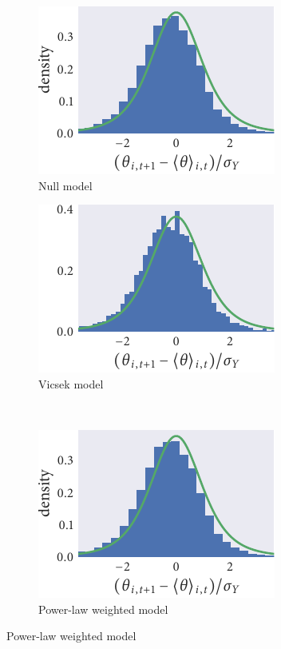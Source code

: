 \begin{figure}
  \begin{subfigure}[b]{0.33333\textwidth}
    \caption{Null model}
    \includegraphics{seq2/null_residuals.pdf}
  \end{subfigure}\hspace{2pt}
  \begin{subfigure}[b]{0.33333\textwidth}
    \caption{Vicsek model}
    \includegraphics{seq2/r_residuals.pdf}
  \end{subfigure}\vspace{1em}\\
  \begin{subfigure}[b]{0.33333\textwidth}
    \includegraphics{seq2/power_residuals.pdf}
    \caption{Power-law weighted model}

\end{subfigure}
\end{figure}
